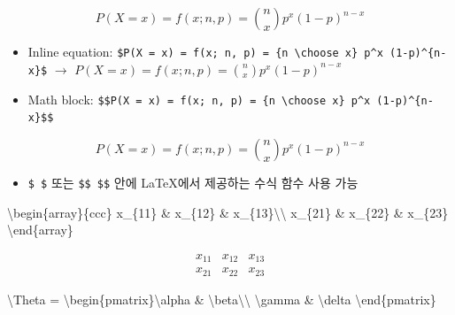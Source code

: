 \documentclass[
  11pt,
]{krantz}
\newenvironment{Shaded}{\begin{snugshade}}{\end{snugshade}}
\newcommand{\SpecialCharTok}[1]{\textcolor[rgb]{0,0,0}{#1}}
\newcommand{\SpecialStringTok}[1]{\textcolor[rgb]{0.5,0.5,0.5}{#1}}
\providecommand{\tightlist}{%
  \setlength{\itemsep}{0pt}\setlength{\parskip}{0pt}}
\begin{document}
\[
  P(X = x) = f(x; n, p) = {n \choose x} p^x (1-p)^{n-x}
\]

\begin{itemize}
\tightlist
\item
  Inline equation: \texttt{\$P(X\ =\ x)\ =\ f(x;\ n,\ p)\ =\ \{n\ \textbackslash{}choose\ x\}\ p\^{}x\ (1-p)\^{}\{n-x\}\$} \(\rightarrow\) \(P(X = x) = f(x; n, p) = {n \choose x} p^x (1-p)^{n-x}\)
\item
  Math block: \texttt{\$\$P(X\ =\ x)\ =\ f(x;\ n,\ p)\ =\ \{n\ \textbackslash{}choose\ x\}\ p\^{}x\ (1-p)\^{}\{n-x\}\$\$}
\end{itemize}

\[P(X = x) = f(x; n, p) = {n \choose x} p^x (1-p)^{n-x}\]

\begin{itemize}
\tightlist
\item
  \texttt{\$\ \$} 또는 \texttt{\$\$\ \$\$} 안에 LaTeX에서 제공하는 수식 함수 사용 가능
\end{itemize}

\begin{Shaded}
\begin{Highlighting}[]
\SpecialStringTok{$$}\SpecialCharTok{\textbackslash{}begin}\SpecialStringTok{\{array\}\{ccc\}}
\SpecialStringTok{x_\{11\} & x_\{12\} & x_\{13\}}\SpecialCharTok{\textbackslash{}\textbackslash{}}
\SpecialStringTok{x_\{21\} & x_\{22\} & x_\{23\}}
\SpecialCharTok{\textbackslash{}end}\SpecialStringTok{\{array\}$$}
\end{Highlighting}
\end{Shaded}

\[\begin{array}{ccc}
x_{11} & x_{12} & x_{13}\\
x_{21} & x_{22} & x_{23}
\end{array}\]

\begin{Shaded}
\begin{Highlighting}[]
\SpecialStringTok{$$}\SpecialCharTok{\textbackslash{}Theta}\SpecialStringTok{ = }\SpecialCharTok{\textbackslash{}begin}\SpecialStringTok{\{pmatrix\}}\SpecialCharTok{\textbackslash{}alpha}\SpecialStringTok{ & }\SpecialCharTok{\textbackslash{}beta\textbackslash{}\textbackslash{}}
\SpecialCharTok{\textbackslash{}gamma}\SpecialStringTok{ & }\SpecialCharTok{\textbackslash{}delta}
\SpecialCharTok{\textbackslash{}end}\SpecialStringTok{\{pmatrix\}$$}
\end{Highlighting}
\end{Shaded}
\end{document}
